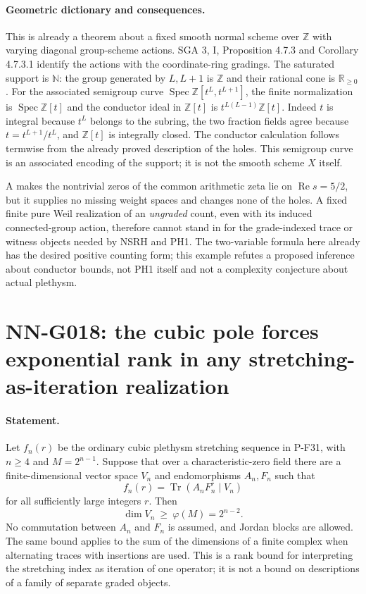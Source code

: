 \paragraph{Geometric dictionary and consequences.}
This is already a theorem about a fixed smooth normal scheme
over $\mathbb Z$ with varying diagonal group-scheme actions.
SGA 3, I, Proposition 4.7.3 and Corollary 4.7.3.1 identify
the actions with the coordinate-ring gradings. The saturated
support is $\mathbb N$: the group generated by $L,L+1$ is
$\mathbb Z$ and their rational cone is $\mathbb R_{\ge0}$.
For the associated semigroup curve
$\operatorname{Spec}\mathbb Z[t^L,t^{L+1}]$, the finite
normalization is $\operatorname{Spec}\mathbb Z[t]$ and the
conductor ideal in $\mathbb Z[t]$ is
$t^{L(L-1)}\mathbb Z[t]$. Indeed $t$ is integral because
$t^L$ belongs to the subring, the two fraction fields agree
because $t=t^{L+1}/t^L$, and $\mathbb Z[t]$ is integrally
closed. The conductor calculation follows termwise from the
already proved description of the holes. This semigroup
curve is an associated encoding of the support; it is not
the smooth scheme $X$ itself.

A makes the nontrivial zeros of the common arithmetic zeta
lie on $\operatorname{Re}s=5/2$, but it supplies no missing
weight spaces and changes none of the holes. A fixed finite
pure Weil realization of an \emph{ungraded} count, even with
its induced connected-group action, therefore cannot stand
in for the grade-indexed trace or witness objects needed by
NSRH and PH1. The two-variable formula here already has
the desired positive counting form; this example refutes a
proposed inference about conductor bounds, not PH1 itself
and not a complexity conjecture about actual plethysm.



\section{NN-G018: the cubic pole forces exponential rank in any stretching-as-iteration realization}
\paragraph{Statement.}
Let $f_n(r)$ be the ordinary cubic plethysm stretching sequence
in P-F31, with $n\ge4$ and $M=2^{n-1}$. Suppose that over a
characteristic-zero field there are a finite-dimensional vector
space $V_n$ and endomorphisms $A_n,F_n$ such that
\[
f_n(r)=\operatorname{Tr}(A_nF_n^r\mid V_n)
\]
for all sufficiently large integers $r$. Then
\[
\dim V_n\ \ge\ \varphi(M)=2^{n-2}.
\tag{G018.1}
\]
No commutation between $A_n$ and $F_n$ is assumed, and Jordan
blocks are allowed. The same bound applies to the sum of the
dimensions of a finite complex when alternating traces with
insertions are used. This is a rank bound for interpreting the
stretching index as iteration of one operator; it is not a
bound on descriptions of a family of separate graded objects.

